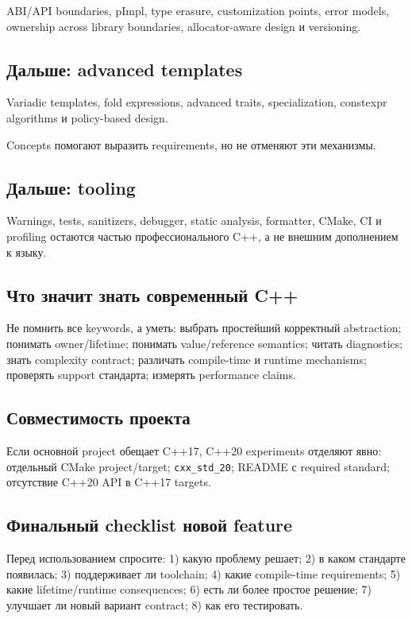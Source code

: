 ABI/API boundaries, pImpl, type erasure, customization points, error models,
ownership across library boundaries, allocator-aware design и versioning.

\subsection{Дальше: advanced templates}

Variadic templates, fold expressions, advanced traits, specialization,
constexpr algorithms и policy-based design.

Concepts помогают выразить requirements, но не отменяют эти механизмы.

\subsection{Дальше: tooling}

Warnings, tests, sanitizers, debugger, static analysis, formatter, CMake, CI и
profiling остаются частью профессионального C++, а не внешним дополнением к
языку.

\subsection{Что значит знать современный C++}

Не помнить все keywords, а уметь:
выбрать простейший корректный abstraction; понимать owner/lifetime; понимать value/reference semantics; читать diagnostics; знать complexity contract; различать compile-time и runtime mechanisms; проверять support стандарта; измерять performance claims.

\subsection{Совместимость проекта}

Если основной project обещает C++17, C++20 experiments отделяют явно:
отдельный CMake project/target; \texttt{cxx\_std\_20}; README с required standard; отсутствие C++20 API в C++17 targets.

\subsection{Финальный checklist новой feature}

Перед использованием спросите:
1) какую проблему решает; 2) в каком стандарте появилась; 3) поддерживает ли toolchain; 4) какие compile-time requirements; 5) какие lifetime/runtime consequences; 6) есть ли более простое решение; 7) улучшает ли новый вариант contract; 8) как его тестировать.

